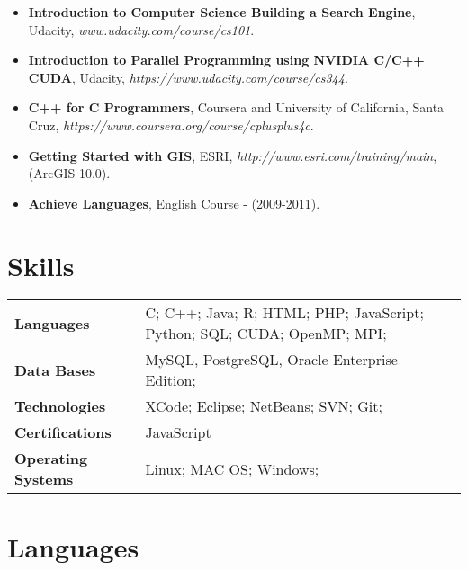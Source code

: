 \documentclass[a4paper, oneside, final]{scrartcl} %
\begin{document}
\begin{center}
\begin{itemize}
\item \textbf{Introduction to Computer Science Building a Search Engine}, Udacity, \linebreak \textit{www.udacity.com/course/cs101}.

\item \textbf{Introduction to Parallel Programming using NVIDIA C/C++ CUDA}, Udacity, \textit{https://www.udacity.com/course/cs344}.

\item \textbf{C++ for C Programmers}, Coursera and University of California, Santa Cruz, \textit{https://www.coursera.org/course/cplusplus4c}.

\item \textbf{Getting Started with GIS}, ESRI, \textit{http://www.esri.com/training/main}, (ArcGIS 10.0).

\item \textbf{Achieve Languages}, English Course - (2009-2011).

\end{itemize}


\section{Skills}

\begin{tabular}{ @{} >{\bfseries}l p{9cm} l  }
Languages & C; C++; Java; R; HTML; PHP; JavaScript; Python; SQL; CUDA; OpenMP; MPI; \\
Data Bases & MySQL, PostgreSQL, Oracle Enterprise Edition; \\
Technologies & XCode; Eclipse; NetBeans; SVN; Git; \\
Certifications & JavaScript\\
Operating Systems & Linux; MAC OS; Windows;
\end{tabular}


\section{Languages}


\end{center}
\end{document}
